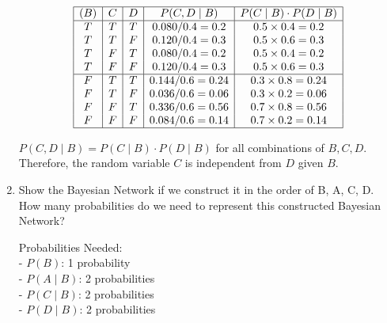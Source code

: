 \documentclass[12pt]{article}
\begin{document}
\begin{enumerate}[font=\Large,label=(\alph*)]
	      $$
		      \begin{array}{|c|c|c|c|c|}
			      \hline
			      (B) & C & D & P(C, D \mid B)   & P(C \mid B) \cdot P(D \mid B) \\
			      \hline
			      T   & T & T & 0.080/0.4 = 0.2  & 0.5 \times 0.4 = 0.2          \\
			      T   & T & F & 0.120/0.4 = 0.3  & 0.5 \times 0.6 = 0.3          \\
			      T   & F & T & 0.080/0.4 = 0.2  & 0.5 \times 0.4 = 0.2          \\
			      T   & F & F & 0.120/0.4 = 0.3  & 0.5 \times 0.6 = 0.3          \\
			      \hline
			      F   & T & T & 0.144/0.6 = 0.24 & 0.3 \times 0.8 = 0.24         \\
			      F   & T & F & 0.036/0.6 = 0.06 & 0.3 \times 0.2 = 0.06         \\
			      F   & F & T & 0.336/0.6 = 0.56 & 0.7 \times 0.8 = 0.56         \\
			      F   & F & F & 0.084/0.6 = 0.14 & 0.7 \times 0.2 = 0.14         \\
			      \hline
		      \end{array}
	      $$

	      $P(C, D \mid B) = P(C \mid B) \cdot P(D \mid B)$ for all combinations of $B,C,D$. Therefore, the random variable $C$ is independent from $D$ given $B$.

	      \newpage
	\item Show the Bayesian Network if we construct it in the order of B, A, C, D. How many probabilities do we need to represent this constructed Bayesian Network?
	      \begin{center}
	      \end{center}

	      Probabilities Needed:\\
	      - $ P(B) $: 1 probability\\
	      - $ P(A \mid B) $: 2 probabilities\\
	      - $ P(C \mid B) $: 2 probabilities\\
	      - $ P(D \mid B) $: 2 probabilities


\end{enumerate}
\end{document}
